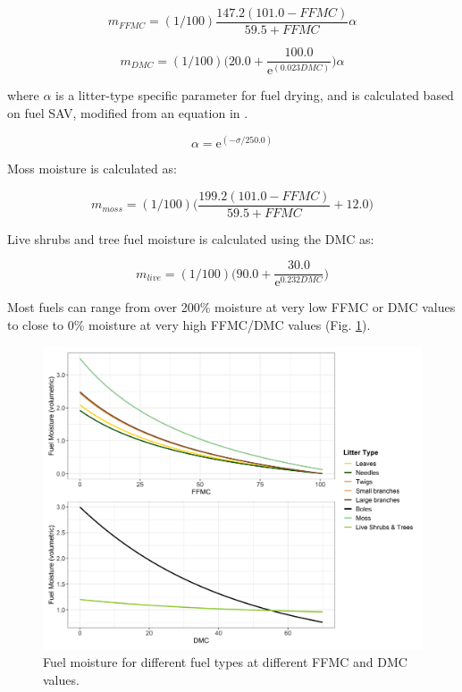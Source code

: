 \documentclass[a4paper, 12pt] {report}
\begin{document}
\begin{equation} 
	m_{FFMC} = (1/100)\frac{147.2(101.0 - FFMC)}{59.5 + FFMC}\alpha
\end{equation}

\begin{equation} 
	m_{DMC} = (1/100)\Big(20.0 + \frac{100.0}{\text{e}^{(0.023DMC)}}\Big)\alpha
\end{equation}

where $\alpha$ is a litter-type specific parameter for fuel drying, and is calculated based on fuel SAV, modified from an equation in .

\begin{equation} 
	\alpha = \text{e}^{(-\sigma/250.0)}
\end{equation}

Moss moisture is calculated as:

\begin{equation} 
	m_{moss} = (1/100)\Big(\frac{199.2(101.0 - FFMC)}{59.5 + FFMC} + 12.0\Big)
\end{equation}

Live shrubs and tree fuel moisture is calculated using the DMC as:

\begin{equation} 
	m_{live} = (1/100)\Big(90.0 + \frac{30.0}{\text{e}^{0.232DMC}}\Big)
\end{equation}

Most fuels can range from over 200\% moisture at very low FFMC or DMC values to close to 0\% moisture at very high FFMC/DMC values (Fig. \ref{fig:fuelmoist}).

\begin{figure}
	\includegraphics[width=\linewidth]{figures/FuelMoisture.png}
	\caption{Fuel moisture for different fuel types at different FFMC and DMC values.}
	\label{fig:fuelmoist}
\end{figure}
\end{document}
